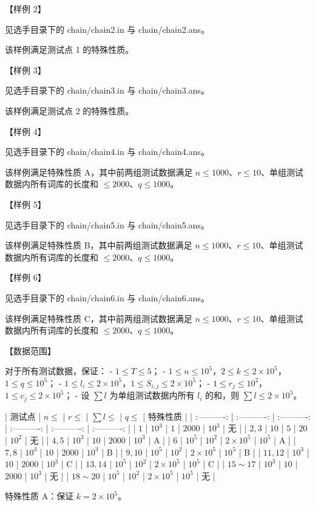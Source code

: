 \documentclass[12pt,twiside,a4paper]{ctexbook}
\numberwithin{chapter}{part}
\begin{document}
【样例 2】

见选手目录下的 chain/chain2.in 与 chain/chain2.ans。

该样例满足测试点 1 的特殊性质。

【样例 3】

见选手目录下的 chain/chain3.in 与 chain/chain3.ans。

该样例满足测试点 2 的特殊性质。

【样例 4】

见选手目录下的 chain/chain4.in 与 chain/chain4.ans。

该样例满足特殊性质 A，其中前两组测试数据满足 $n \leq 1000$、$r \leq 10$、单组测试数据内所有词库的长度和 $\leq 2000$、$q \leq 1000$。

【样例 5】

见选手目录下的 chain/chain5.in 与 chain/chain5.ans。

该样例满足特殊性质 B，其中前两组测试数据满足 $n \leq 1000$、$r \leq 10$、单组测试数据内所有词库的长度和 $\leq 2000$、$q \leq 1000$。

【样例 6】

见选手目录下的 chain/chain6.in 与 chain/chain6.ans。

该样例满足特殊性质 C，其中前两组测试数据满足 $n \leq 1000$、$r \leq 10$、单组测试数据内所有词库的长度和 $\leq 2000$、$q \leq 1000$。

【数据范围】

对于所有测试数据，保证：
- $1 \leq T \leq 5$；
- $1 \leq n \leq 10^5$，$2 \leq k \leq 2 \times 10^5$，$1 \leq q \leq 10^5$；
- $1 \leq l_i \leq 2 \times 10^5$，$1 \leq S_{i,j} \leq 2 \times 10^5$；
- $1 \leq r_j \leq 10^2$，$1 \leq c_j \leq 2 \times 10^5$；
- 设 $\sum l$ 为单组测试数据内所有 $l_i$ 的和，则 $\sum l\leq 2\times 10^5$。

| 测试点 | $n\leq$ | $r\leq$ | $\sum l\leq$ | $q\leq$ | 特殊性质 |
| :----------: | :----------: | :----------: | :----------: | :----------: | :----------: |
| $1$ | $10^3$ | $1$ | $2000$ | $10^3$ | 无 |
| $2,3$ | $10$ | $5$ | $20$ | $10^2$ | 无 |
| $4,5$ | $10^3$ | $10$ | $2000$ | $10^3$ | A |
| $6$ | $10^5$ | $10^2$ | $2\times 10^5$ | $10^5$ | A |
| $7,8$ | $10^3$ | $10$ | $2000$ | $10^3$ | B |
| $9,10$ | $10^5$ | $10^2$ | $2\times 10^5$ | $10^5$ | B |
| $11,12$ | $10^3$ | $10$ | $2000$ | $10^3$ | C |
| $13,14$ | $10^5$ | $10^2$ | $2\times 10^5$ | $10^5$ | C |
| $15\sim 17$ | $10^3$ | $10$ | $2000$ | $10^3$ | 无 |
| $18\sim 20$ | $10^5$ | $10^2$ | $2\times 10^5$ | $10^5$ | 无 |

特殊性质 A：保证 $k = 2 \times 10^5$。
\end{document}
